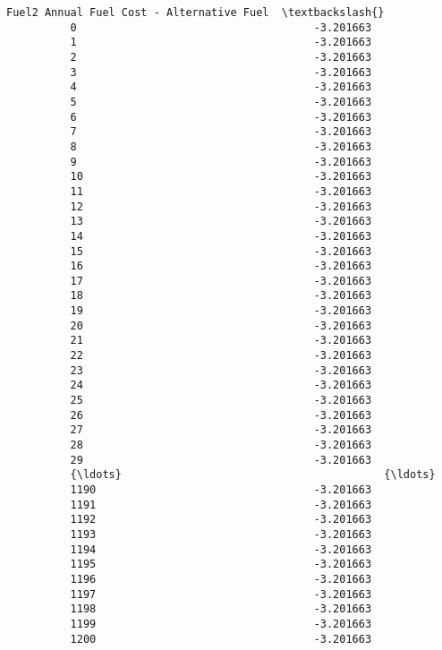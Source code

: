 \documentclass[11pt]{article}
\begin{document}
\begin{Verbatim}[commandchars=\\\{\}]
                Fuel2 Annual Fuel Cost - Alternative Fuel  \textbackslash{}
          0                                     -3.201663   
          1                                     -3.201663   
          2                                     -3.201663   
          3                                     -3.201663   
          4                                     -3.201663   
          5                                     -3.201663   
          6                                     -3.201663   
          7                                     -3.201663   
          8                                     -3.201663   
          9                                     -3.201663   
          10                                    -3.201663   
          11                                    -3.201663   
          12                                    -3.201663   
          13                                    -3.201663   
          14                                    -3.201663   
          15                                    -3.201663   
          16                                    -3.201663   
          17                                    -3.201663   
          18                                    -3.201663   
          19                                    -3.201663   
          20                                    -3.201663   
          21                                    -3.201663   
          22                                    -3.201663   
          23                                    -3.201663   
          24                                    -3.201663   
          25                                    -3.201663   
          26                                    -3.201663   
          27                                    -3.201663   
          28                                    -3.201663   
          29                                    -3.201663   
          {\ldots}                                         {\ldots}   
          1190                                  -3.201663   
          1191                                  -3.201663   
          1192                                  -3.201663   
          1193                                  -3.201663   
          1194                                  -3.201663   
          1195                                  -3.201663   
          1196                                  -3.201663   
          1197                                  -3.201663   
          1198                                  -3.201663   
          1199                                  -3.201663   
          1200                                  -3.201663   

\end{Verbatim}
\end{document}
